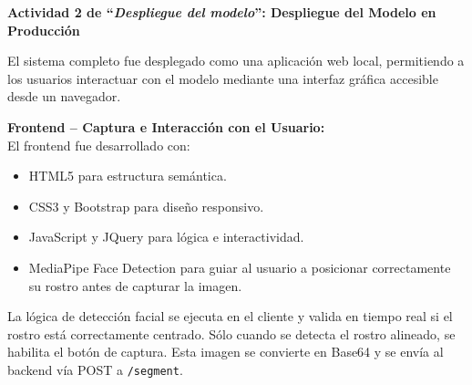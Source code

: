 \vspace{1em}
\textbf{Actividad 2 de “\textit{Despliegue del modelo}”: Despliegue del Modelo en Producción}

El sistema completo fue desplegado como una aplicación web local, permitiendo a los usuarios interactuar con el modelo mediante una interfaz gráfica accesible desde un navegador.

\textbf{Frontend – Captura e Interacción con el Usuario:}
\\
El frontend fue desarrollado con:
\begin{itemize}
\item HTML5 para estructura semántica.
\item CSS3 y Bootstrap para diseño responsivo.
\item JavaScript y JQuery para lógica e interactividad.
\item MediaPipe Face Detection para guiar al usuario a posicionar correctamente su rostro antes de capturar la imagen.
\end{itemize}

La lógica de detección facial se ejecuta en el cliente y valida en tiempo real si el rostro está correctamente centrado. Sólo cuando se detecta el rostro alineado, se habilita el botón de captura. Esta imagen se convierte en Base64 y se envía al backend vía POST a \texttt{/segment}.

